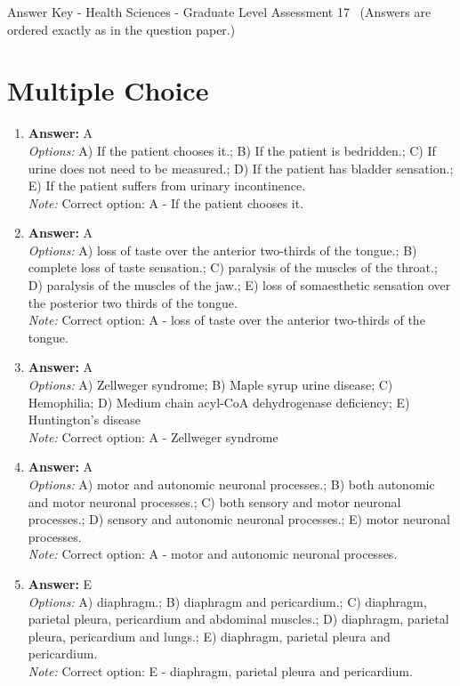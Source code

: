 \documentclass[12pt]{article}
\begin{document}
\begin{center}
Answer Key - Health Sciences - Graduate Level Assessment 17 \
\small (Answers are ordered exactly as in the question paper.)
\end{center}

\section*{Multiple Choice}
\begin{enumerate}[label=\arabic*.]
\item \textbf{Answer:} A
\\ \textit{Options:} A) If the patient chooses it.; B) If the patient is bedridden.; C) If urine does not need to be measured.; D) If the patient has bladder sensation.; E) If the patient suffers from urinary incontinence.
\\ \textit{Note:} Correct option: A - If the patient chooses it.
\item \textbf{Answer:} A
\\ \textit{Options:} A) loss of taste over the anterior two-thirds of the tongue.; B) complete loss of taste sensation.; C) paralysis of the muscles of the throat.; D) paralysis of the muscles of the jaw.; E) loss of somaesthetic sensation over the posterior two thirds of the tongue.
\\ \textit{Note:} Correct option: A - loss of taste over the anterior two-thirds of the tongue.
\item \textbf{Answer:} A
\\ \textit{Options:} A) Zellweger syndrome; B) Maple syrup urine disease; C) Hemophilia; D) Medium chain acyl-CoA dehydrogenase deficiency; E) Huntington's disease
\\ \textit{Note:} Correct option: A - Zellweger syndrome
\item \textbf{Answer:} A
\\ \textit{Options:} A) motor and autonomic neuronal processes.; B) both autonomic and motor neuronal processes.; C) both sensory and motor neuronal processes.; D) sensory and autonomic neuronal processes.; E) motor neuronal processes.
\\ \textit{Note:} Correct option: A - motor and autonomic neuronal processes.
\item \textbf{Answer:} E
\\ \textit{Options:} A) diaphragm.; B) diaphragm and pericardium.; C) diaphragm, parietal pleura, pericardium and abdominal muscles.; D) diaphragm, parietal pleura, pericardium and lungs.; E) diaphragm, parietal pleura and pericardium.
\\ \textit{Note:} Correct option: E - diaphragm, parietal pleura and pericardium.
\end{enumerate}
\end{document}
